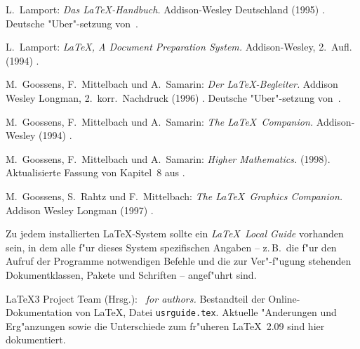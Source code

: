 \documentclass[11pt,a4paper]{article} %
\begin{document}
\newpage

\setcounter{page}{1}
\tableofcontents

\newpage
 

\clearpage


\clearpage
 
 

\clearpage
 

\clearpage


\clearpage


\clearpage



\begin{thebibliography}{99}  %
 
L.~Lamport: \textit{Das \LaTeX-Handbuch.}
Addison-Wesley Deutschland (1995)%
. Deutsche "Uber"-setzung von~\cite{manual-eng}.

L.~Lamport: \textit{\LaTeX, A Document Preparation System.}
Ad\-di\-son-Wesley, 2.~Aufl. (1994)%
.
 
M.~Goossens, F.~Mittelbach und A.~Samarin:
\textit{Der \LaTeX-Begleiter.}
Ad\-di\-son Wesley Longman, 2.~korr.\ Nachdruck (1996)%
.  Deutsche "Uber"-setzung von~\cite{wonne-eng}.

M.~Goossens, F.~Mittelbach und A.~Samarin:
\textit{The \LaTeX\ Companion.}
Ad\-di\-son-Wesley (1994)%
.  

M.~Goossens, F.~Mittelbach und A.~Samarin:
\textit{Higher Mathematics.} 
 (1998).
Aktualisierte Fassung von Kapitel\ 8 aus \cite{wonne-eng}.

M.~Goossens, S.~Rahtz und F.~Mittelbach:
\textit{The \LaTeX\ Graphics Companion.}
Addison Wesley Longman (1997)%
.

Zu jedem installierten \LaTeX-System sollte ein
\emph{\LaTeX\ Local Guide} vorhanden sein, in dem alle f"ur
dieses System spezifischen Angaben -- z.\,B.~die f"ur den
Aufruf der Programme notwendigen Befehle und die zur Ver"-f"ugung
stehenden Dokumentklassen, Pakete und Schriften -- angef"uhrt sind.
 
\LaTeX3 Project Team (Hrsg.): 
\textit{\LaTeXe\ for authors.} 
Bestandteil der Online-Dokumentation von \LaTeX,
Datei \texttt{usrguide.tex}.  
Aktuelle "Anderungen und Erg"anzungen sowie die Unterschiede zum fr"uheren 
\LaTeX~2.09 sind hier dokumentiert.


\end{thebibliography}
\end{document}
